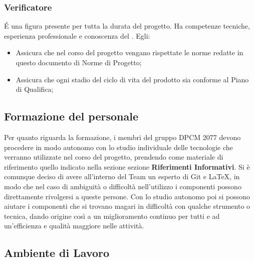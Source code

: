 \subsubsection{Verificatore}
\'E una figura presente per tutta la durata del progetto. Ha competenze tecniche, esperienza professionale e conoscenza del .	
Egli:
\begin{itemize}
\item{Assicura che nel corso del progetto vengano rispettate le norme redatte in questo documento di Norme di Progetto;}
\item{Assicura che ogni stadio del ciclo di vita del prodotto sia conforme al Piano di Qualifica;}
\end{itemize}


\subsection{Formazione del personale}
Per quanto riguarda la formazione, i membri del gruppo DPCM 2077 devono procedere in modo autonomo con lo studio individuale delle tecnologie che verranno utilizzate nel corso del progetto, prendendo come materiale di riferimento quello indicato nella sezione sezione \textbf{Riferimenti Informativi}. Si è comunque deciso di avere all'interno del Team un esperto di Git e {\LaTeX}, in modo che nel caso di ambiguità o difficoltà nell'utilizzo i componenti possono direttamente
rivolgersi a queste persone. Con lo studio autonomo poi si possono aiutare i componenti che si trovano magari in difficoltà con qualche strumento o tecnica, dando origine così a un miglioramento continuo per tutti e ad un'efficienza e qualità maggiore nelle attività. 



\subsection{Ambiente di Lavoro}

